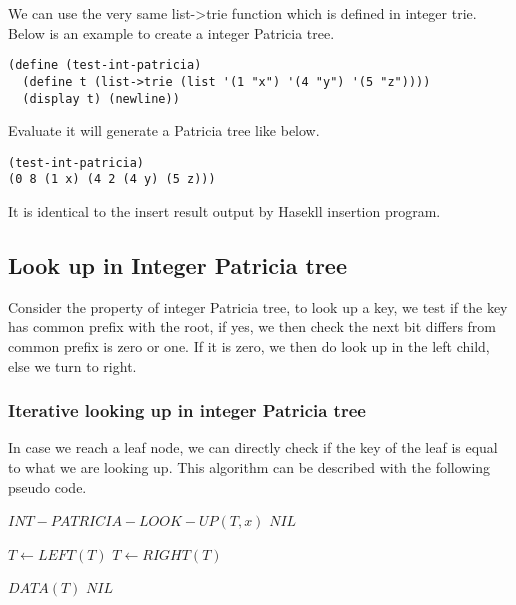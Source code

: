 \documentclass{article}
\begin{document}
We can use the very same list->trie function which is defined in
integer trie. Below is an example to create a integer Patricia tree.

\begin{lstlisting}
(define (test-int-patricia)
  (define t (list->trie (list '(1 "x") '(4 "y") '(5 "z"))))
  (display t) (newline))
\end{lstlisting}

Evaluate it will generate a Patricia tree like below.

\begin{lstlisting}
(test-int-patricia)
(0 8 (1 x) (4 2 (4 y) (5 z)))
\end{lstlisting}

It is identical to the insert result output by Hasekll insertion program.

\subsection{Look up in Integer Patricia tree}
Consider the property of integer Patricia tree, to look up a
key, we test if the key has common prefix with the root, if yes, we
then check the next bit differs from common prefix is zero or one. If
it is zero, we then do look up in the left child, else we turn to
right.

\subsubsection{Iterative looking up in integer Patricia tree}

In case we reach a leaf node, we can directly check if the key of the
leaf is equal to what we are looking up. This algorithm can be
described with the following pseudo code.

\begin{algorithmic}
\STATE $INT-PATRICIA-LOOK-UP(T, x)$
    \RETURN $NIL$ \ENDIF

      \STATE $T \leftarrow LEFT(T)$
    \ELSE
      \STATE $T \leftarrow RIGHT(T)$
    \ENDIF
  \ENDWHILE

    \RETURN $DATA(T)$ 
  \ELSE
    \RETURN $NIL$
  \ENDIF
\end{algorithmic}
\end{document}
